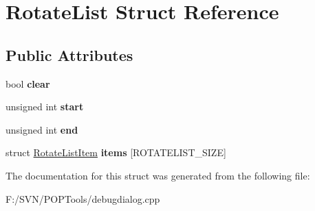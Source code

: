 \hypertarget{struct_rotate_list}{\section{Rotate\-List Struct Reference}
\label{struct_rotate_list}
}
\subsection*{Public Attributes}
\begin{DoxyCompactItemize}
\item 
\hypertarget{struct_rotate_list_a52fd4a625dccae1f8cc9ce14e6a7fe5e}{bool {\bfseries clear}}\label{struct_rotate_list_a52fd4a625dccae1f8cc9ce14e6a7fe5e}

\item 
\hypertarget{struct_rotate_list_a3ba0fa27b119cad91efb45324464565a}{unsigned int {\bfseries start}}\label{struct_rotate_list_a3ba0fa27b119cad91efb45324464565a}

\item 
\hypertarget{struct_rotate_list_a35084a23bb8c6edc918448bf7735f841}{unsigned int {\bfseries end}}\label{struct_rotate_list_a35084a23bb8c6edc918448bf7735f841}

\item 
\hypertarget{struct_rotate_list_af9c925950f7c96cbb49ef9ba33eeca23}{struct \hyperlink{struct_rotate_list_item}{Rotate\-List\-Item} {\bfseries items} \mbox{[}R\-O\-T\-A\-T\-E\-L\-I\-S\-T\-\_\-\-S\-I\-Z\-E\mbox{]}}\label{struct_rotate_list_af9c925950f7c96cbb49ef9ba33eeca23}

\end{DoxyCompactItemize}


The documentation for this struct was generated from the following file\-:\begin{DoxyCompactItemize}
\item 
F\-:/\-S\-V\-N/\-P\-O\-P\-Tools/debugdialog.\-cpp\end{DoxyCompactItemize}
